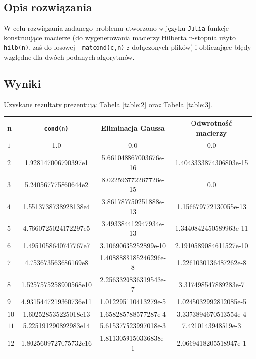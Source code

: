 \documentclass{classrep}
\begin{document}
	\subsection{Opis rozwiązania}
		W celu rozwiązania zadanego problemu utworzono w języku \texttt{Julia} funkcje konstruujące macierze (do wygenerowania macierzy Hilberta n-stopnia użyto \texttt{hilb(n)}, zaś do losowej - \texttt{matcond(c,n)} z dołączonych plików) i obliczające błędy względne dla dwóch podanych algorytmów.
	\subsection{Wyniki}
		Uzyskane rezultaty prezentują: Tabela \ref{table:2} oraz Tabela \ref{table:3}.
		\begin{table}[!h]
        	\centering
        	\footnotesize
			\begin{tabular}{l|S|S|S} \toprule
				{n} & {\texttt{cond(n)}} & {Eliminacja Gaussa} & {Odwrotność macierzy} \\ \midrule
				$1$ & 1.0 & 0.0 & 0.0 \\ 
	 			$2$ & 1.928147006790397e1 & 5.661048867003676e-16 & 1.4043333874306803e-15 \\
	 			$3$ & 5.240567775860644e2 & 8.022593772267726e-15 & 0.0 \\
	 			$4$ & 1.5513738738928138e4 & 3.861787750251888e-13 & 1.156679772130055e-13 \\
	 			$5$ & 4.7660725024172297e5 & 3.493384412947934e-13 & 1.3440842450589963e-11 \\ 
	 			$6$ & 1.4951058640747767e7  & 3.10690635252899e-10 & 2.1910589084611527e-10 \\
	 			$7$ & 4.753673563686169e8 & 1.4088888185246296e-8 & 1.2261030136487262e-8 \\
	 			$8$ & 1.5257575258900568e10 & 2.2563320836319543e-7 & 3.317498547889283e-7 \\ 
	 			$9$ & 4.9315447219360736e11  & 1.012295110413279e-5 & 1.0245032992812085e-5 \\
	 			$10$ & 1.602528535225018e13 & 1.658285788577287e-4 & 3.3373894670513554e-4 \\
	 			$11$ & 5.225191290892983e14 & 5.615377523997018e-3 & 7.4210143948519e-3 \\ 
	 			$12$ & 1.8025609727075732e16 & 1.8113059150336838e-1 & 2.0669418205518947e-1 \\

\end{tabular}
\end{table}
\end{document}
